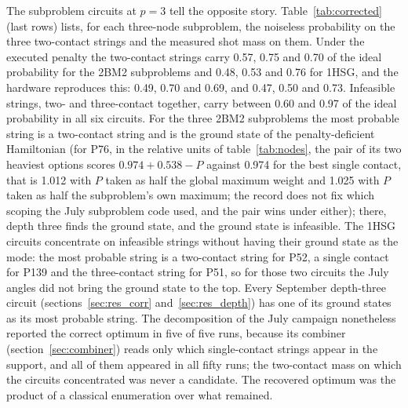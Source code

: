 \documentclass{iopjournal}
\begin{document}
The subproblem circuits at $p=3$ tell the opposite story. Table~\ref{tab:corrected} (last rows) lists, for each three-node subproblem, the noiseless probability on the three two-contact strings and the measured shot mass on them. Under the executed penalty the two-contact strings carry 0.57, 0.75 and 0.70 of the ideal probability for the 2BM2 subproblems and 0.48, 0.53 and 0.76 for 1HSG, and the hardware reproduces this: 0.49, 0.70 and 0.69, and 0.47, 0.50 and 0.73. Infeasible strings, two- and three-contact together, carry between 0.60 and 0.97 of the ideal probability in all six circuits. For the three 2BM2 subproblems the most probable string is a two-contact string and is the ground state of the penalty-deficient Hamiltonian (for P76, in the relative units of table~\ref{tab:nodes}, the pair of its two heaviest options scores $0.974 + 0.538 - P$ against 0.974 for the best single contact, that is 1.012 with $P$ taken as half the global maximum weight and 1.025 with $P$ taken as half the subproblem's own maximum; the record does not fix which scoping the July subproblem code used, and the pair wins under either); there, depth three finds the ground state, and the ground state is infeasible. The 1HSG circuits concentrate on infeasible strings without having their ground state as the mode: the most probable string is a two-contact string for P52, a single contact for P139 and the three-contact string for P51, so for those two circuits the July angles did not bring the ground state to the top. Every September depth-three circuit (sections~\ref{sec:res_corr} and~\ref{sec:res_depth}) has one of its ground states as its most probable string. The decomposition of the July campaign nonetheless reported the correct optimum in five of five runs, because its combiner (section~\ref{sec:combiner}) reads only which single-contact strings appear in the support, and all of them appeared in all fifty runs; the two-contact mass on which the circuits concentrated was never a candidate. The recovered optimum was the product of a classical enumeration over what remained.
\end{document}
